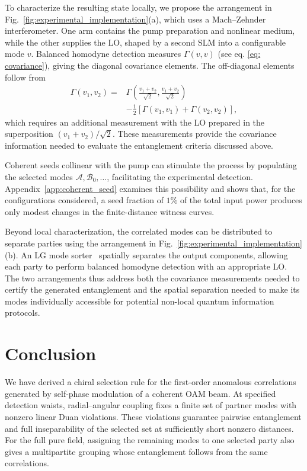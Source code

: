\documentclass[%
 reprint,
 amsmath,amssymb,
 aps,
pra,
twocolumn,
]{revtex4-2}
\begin{document}
To characterize the resulting state locally, we propose the arrangement in Fig.~\ref{fig:experimental_implementation}(a), which uses a Mach--Zehnder interferometer. One arm contains the pump preparation and nonlinear medium, while the other supplies the LO, shaped by a second SLM into a configurable mode $v$. Balanced homodyne detection measures $\Gamma(v,v)$ (see eq. \eqref{eq: covariance}), giving the diagonal covariance elements. The off-diagonal elements follow from
\begin{equation}
\begin{aligned}
        \Gamma(v_1,v_2) = &\Gamma\left(\frac{v_1+v_2}{\sqrt{2}},\frac{v_1+v_2}{\sqrt{2}}\right) \\&- \frac{1}{2}\left[ \Gamma(v_1,v_1) + \Gamma(v_2,v_2) \right],
\end{aligned}
\end{equation}
which requires an additional measurement with the LO prepared in the superposition $(v_1+v_2)/\sqrt{2}$. These measurements provide the covariance information needed to evaluate the entanglement criteria discussed above.

Coherent seeds collinear with the pump can stimulate the process by populating the selected modes $\mathcal{A},\mathcal{B}_0,\dots$, facilitating the experimental detection. Appendix~\ref{app:coherent_seed} examines this possibility and shows that, for the configurations considered, a seed fraction of $1\%$ of the total input power produces only modest changes in the finite-distance witness curves.

Beyond local characterization, the correlated modes can be distributed to separate parties using the arrangement in Fig.~\ref{fig:experimental_implementation}(b). An LG mode sorter~\cite{fontaine_laguerre_gaussian_2019,bearne_diffractive_2026,mirhosseini_efficient_2013,berkhout_efficient_2010,jia_vector_2023} spatially separates the output components, allowing each party to perform balanced homodyne detection with an appropriate LO. The two arrangements thus address both the covariance measurements needed to certify the generated entanglement and the spatial separation needed to make its modes individually accessible for potential non-local quantum information protocols.


\section{Conclusion}
\label{sec:conclusion}

We have derived a chiral selection rule for the first-order anomalous correlations generated by self-phase modulation of a coherent OAM beam. At specified detection waists, radial--angular coupling fixes a finite set of partner modes with nonzero linear Duan violations. These violations guarantee pairwise entanglement and full inseparability of the selected set at sufficiently short nonzero distances. For the full pure field, assigning the remaining modes to one selected party also gives a multipartite grouping whose entanglement follows from the same correlations.
\end{document}
